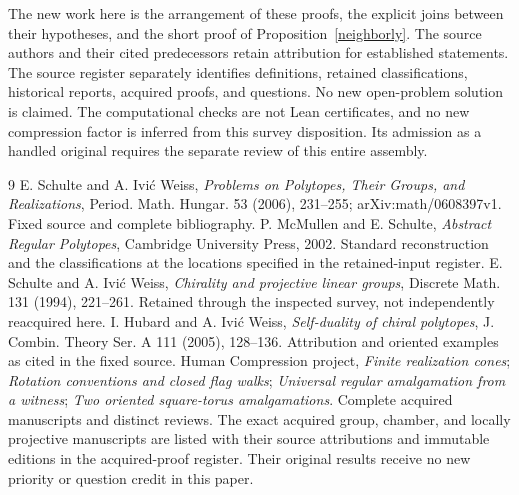 \documentclass[11pt,a4paper]{article}
\begin{document}
The new work here is the arrangement of these proofs,
the explicit joins between their hypotheses, and the
short proof of Proposition~\ref{neighborly}. The source
authors and their cited predecessors retain attribution
for established statements. The source register separately
identifies definitions, retained classifications,
historical reports, acquired proofs, and questions.
No new open-problem solution is claimed. The computational
checks are not Lean certificates, and no new compression
factor is inferred from this survey disposition. Its
admission as a handled original requires the separate
review of this entire assembly.

\begin{thebibliography}{9}\small
{} E. Schulte and A. Ivi\'c Weiss,
\emph{Problems on Polytopes, Their Groups, and Realizations},
Period. Math. Hungar. 53 (2006), 231--255;
arXiv:math/0608397v1. Fixed source and complete bibliography.
 P. McMullen and E. Schulte,
\emph{Abstract Regular Polytopes}, Cambridge University
Press, 2002. Standard reconstruction and the classifications
at the locations specified in the retained-input register.
 E. Schulte and A. Ivi\'c Weiss,
\emph{Chirality and projective linear groups}, Discrete
Math. 131 (1994), 221--261. Retained through the
inspected survey, not independently reacquired here.
 I. Hubard and A. Ivi\'c Weiss,
\emph{Self-duality of chiral polytopes}, J. Combin.
Theory Ser. A 111 (2005), 128--136. Attribution and
oriented examples as cited in the fixed source.
 Human Compression project,
\emph{Finite realization cones};
\emph{Rotation conventions and closed flag walks};
\emph{Universal regular amalgamation from a witness};
\emph{Two oriented square-torus amalgamations}.
Complete acquired manuscripts and distinct reviews.
 The exact acquired group, chamber,
and locally projective manuscripts are listed with their
source attributions and immutable editions in the
acquired-proof register. Their original results receive
no new priority or question credit in this paper.
\end{thebibliography}
\end{document}
